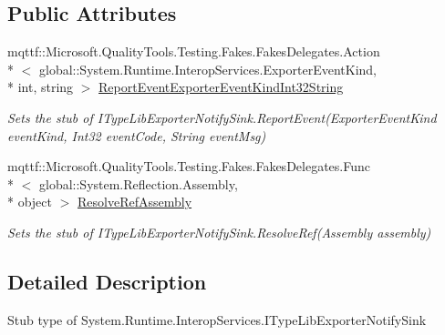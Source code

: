 \subsection*{Public Attributes}
\begin{DoxyCompactItemize}
\item 
mqttf\-::\-Microsoft.\-Quality\-Tools.\-Testing.\-Fakes.\-Fakes\-Delegates.\-Action\\*
$<$ global\-::\-System.\-Runtime.\-Interop\-Services.\-Exporter\-Event\-Kind, \\*
int, string $>$ \hyperlink{class_system_1_1_runtime_1_1_interop_services_1_1_fakes_1_1_stub_i_type_lib_exporter_notify_sink_ab47ba0b792f0aa2647aefbec8f87b684}{Report\-Event\-Exporter\-Event\-Kind\-Int32\-String}
\begin{DoxyCompactList}\small\item\em Sets the stub of I\-Type\-Lib\-Exporter\-Notify\-Sink.\-Report\-Event(\-Exporter\-Event\-Kind event\-Kind, Int32 event\-Code, String event\-Msg)\end{DoxyCompactList}\item 
mqttf\-::\-Microsoft.\-Quality\-Tools.\-Testing.\-Fakes.\-Fakes\-Delegates.\-Func\\*
$<$ global\-::\-System.\-Reflection.\-Assembly, \\*
object $>$ \hyperlink{class_system_1_1_runtime_1_1_interop_services_1_1_fakes_1_1_stub_i_type_lib_exporter_notify_sink_ad301d2da53cf3abe50ef5e29d2690eb9}{Resolve\-Ref\-Assembly}
\begin{DoxyCompactList}\small\item\em Sets the stub of I\-Type\-Lib\-Exporter\-Notify\-Sink.\-Resolve\-Ref(\-Assembly assembly)\end{DoxyCompactList}\end{DoxyCompactItemize}


\subsection{Detailed Description}
Stub type of System.\-Runtime.\-Interop\-Services.\-I\-Type\-Lib\-Exporter\-Notify\-Sink



